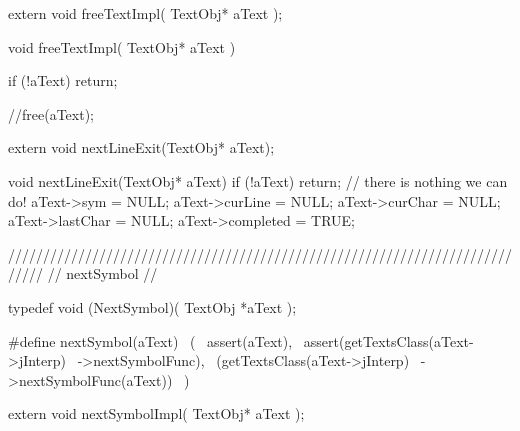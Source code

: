 \startCHeader
extern void freeTextImpl(
  TextObj* aText
);
\stopCHeader
{}

\startCCode
void freeTextImpl(
  TextObj* aText
) {
  if (!aText) return;

  //free(aText);
}
\stopCCode

\startCHeader
extern void nextLineExit(TextObj* aText);
\stopCHeader
{}

\startCCode
void nextLineExit(TextObj* aText) {
  if (!aText) return; // there is nothing we can do!
  aText->sym       = NULL;
  aText->curLine   = NULL;
  aText->curChar   = NULL;
  aText->lastChar  = NULL;
  aText->completed = TRUE;
}
\stopCCode

/////////////////////////////////////////////////////////////////////////////
// nextSymbol
//

\startCHeader
typedef void (NextSymbol)(
  TextObj *aText
);

#define nextSymbol(aText)                 \
  (                                       \
    assert(aText),                        \
    assert(getTextsClass(aText->jInterp)  \
      ->nextSymbolFunc),                  \
    (getTextsClass(aText->jInterp)        \
      ->nextSymbolFunc(aText))            \
  )
\stopCHeader

\setCHeaderStream{private}
\startCHeader
extern void nextSymbolImpl(
  TextObj* aText
);
\stopCHeader
{}

